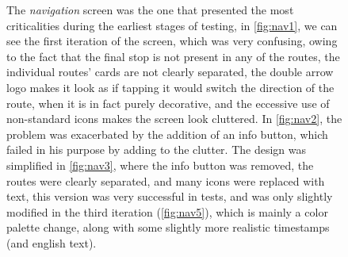 \documentclass[a4paper, 11pt]{report}
\begin{document}
\begin{figure}[H]
{	}\hspace{0.5pt}
	\caption{
		The \emph{navigation} screen was the one that presented the most criticalities during the earliest stages of testing,
		in \cref{fig:nav1}, we can see the first iteration of the screen, which was very confusing, owing to the fact that
		the final stop is not present in any of the routes, the individual routes' cards are not clearly separated,
		the double arrow logo makes it look as if tapping it would switch the direction of the route, when it is in fact
		purely decorative, and the eccessive use of non-standard icons makes the screen look cluttered. In \cref{fig:nav2},
		the problem was exacerbated by the addition of an info button, which failed in his purpose by adding to the clutter.
		The design was simplified in \cref{fig:nav3}, where the info button was removed, the routes were clearly separated,
		and many icons were replaced with text, this version was very successful in tests, and was only slightly modified
		in the third iteration (\cref{fig:nav5}), which is mainly a color palette change, along with some slightly
		more realistic timestamps (and english text).}\label{fig:nav}
\end{figure}
\end{document}
